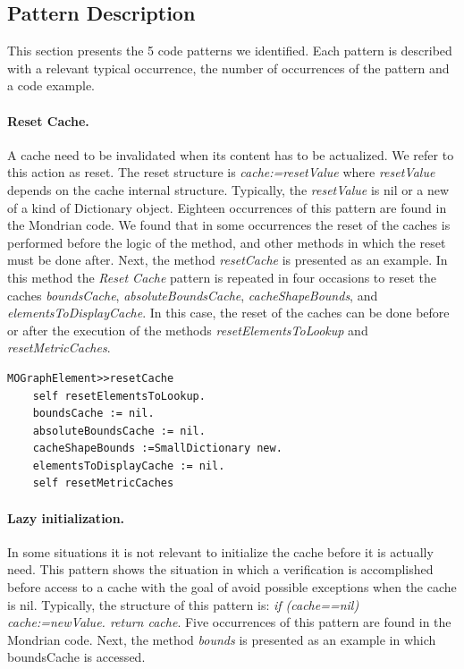 \documentclass[preprint,10pt]{sigplanconf}
\begin{document}
\subsection{Pattern Description\label{sub:Pattern-Identification}}

This section presents the 5 code patterns we identified. 
Each pattern is described with a relevant typical occurrence,
the number of occurrences of the pattern and a code example.

\paragraph{Reset Cache.} A cache need to be invalidated when its content has to be actualized. We refer to this action as reset. The reset structure is \emph{cache:=resetValue} where
\emph{resetValue} depends on the cache internal structure. Typically,
the \emph{resetValue} is nil or a new of a kind of Dictionary object.
Eighteen occurrences of this pattern are found in the Mondrian code. 
We found that in some occurrences the reset of the caches is performed before the logic of the method, and other methods in which the reset must be done after. 
Next, the method \emph{resetCache} is presented as an example. In
this method the \emph{Reset Cache} pattern is repeated in four occasions
to reset the caches \emph{boundsCache}, \emph{absoluteBoundsCache},
\emph{cacheShapeBounds}, and \emph{elementsToDisplayCache}. In this case, the reset of the caches can be done before or after the execution of the methods \emph{resetElementsToLookup} and  \emph{resetMetricCaches}.

\begin{lstlisting} 
MOGraphElement>>resetCache 
	self resetElementsToLookup.
	boundsCache := nil. 
	absoluteBoundsCache := nil. 
	cacheShapeBounds :=SmallDictionary new. 
	elementsToDisplayCache := nil. 
	self resetMetricCaches
\end{lstlisting}

\paragraph{Lazy initialization.} In some situations it is not relevant to initialize the cache before it is actually need. This pattern shows
the situation in which a verification is accomplished before access
to a cache with the goal of avoid possible exceptions when the cache
is nil. Typically, the structure of this pattern is: \emph{if (cache==nil)
cache:=newValue. return cache}. Five occurrences of this pattern are
found in the Mondrian code. Next, the method \emph{bounds} is presented
as an example in which boundsCache is accessed.
\end{document}

